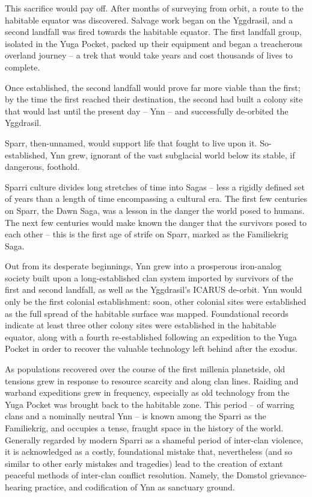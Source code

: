 This sacrifice would pay off. After months of surveying from orbit, a route to the habitable equator  
was discovered. Salvage work began on the  Yggdrasil, and a second landfall was fired towards  
the habitable equator. The first landfall group, isolated in the Yuga Pocket, packed up their  
equipment and began a treacherous overland journey -- a trek that would take years and cost  
thousands of lives to complete.   

Once established, the second landfall would prove far more viable than the first; by the time the  
first reached their destination, the second had built a colony site that would last until the present  
day -- Ynn -- and successfully de-orbited the Yggdrasil.   

                                                                                                          


Sparr, then-unnamed, would support life that fought to live upon it. So-established, Ynn grew,  
ignorant of the vast subglacial world below its stable, if dangerous, foothold.   

Sparri culture divides long stretches of time into Sagas -- less a rigidly defined set of years than a  
length of time encompassing a cultural era. The first few centuries on Sparr, the Dawn Saga, was  
a lesson in the danger the world posed to humans. The next few centuries would make known the  
danger that the survivors posed to each other -- this is the first age of strife on Sparr, marked as  
the Familiekrig Saga.   

Out from its desperate beginnings, Ynn grew into a prosperous iron-analog society built upon a  
long-established clan system imported by survivors of the first and second landfall, as well as the  
Yggdrasil’s ICARUS de-orbit. Ynn would only be the first colonial establishment: soon, other  
colonial sites were established as the full spread of the habitable surface was mapped.  
Foundational records indicate at least three other colony sites were established in the habitable  
equator, along with a fourth re-established following an expedition to the Yuga Pocket in order to  
recover the valuable technology left behind after the exodus.   

As populations recovered over the course of the first millenia planetside, old tensions grew in  
response to resource scarcity and along clan lines. Raiding and warband expeditions grew in  
frequency, especially as old technology from the Yuga Pocket was brought back to the habitable  
zone. This period -- of warring clans and a nominally neutral Ynn -- is known among the Sparri as  
the Familiekrig, and occupies a tense, fraught space in the history of the world. Generally  
regarded by modern Sparri as a shameful period of inter-clan violence, it is acknowledged as a  
costly, foundational mistake that, nevertheless (and so similar to other early mistakes and  
tragedies) lead to the creation of extant peaceful methods of inter-clan conflict resolution. Namely,  
the Domstol grievance-hearing practice, and codification of Ynn as sanctuary ground.    


